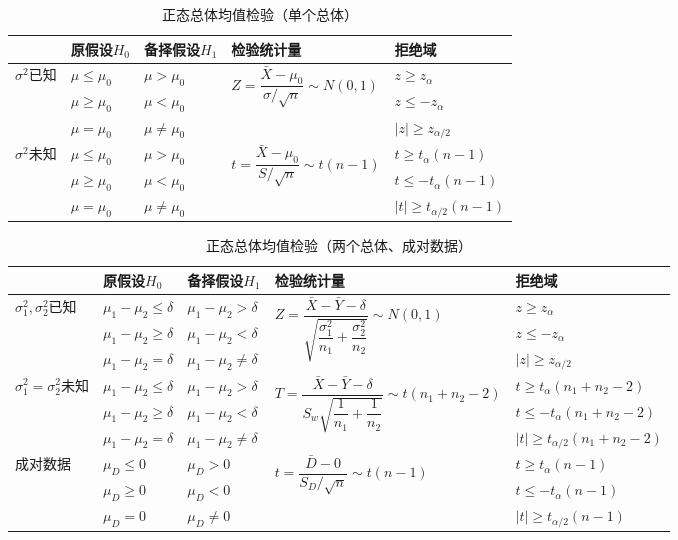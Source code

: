 \documentclass[11pt,a4paper]{report}
\theoremstyle{definition}
\theoremstyle{plain}
\begin{document}
\begin{table}[htbp]
\centering
\caption{正态总体均值检验（单个总体）}
\begin{tabular}{@{}lllll@{}}
\toprule
 & \textbf{原假设}$H_0$ & \textbf{备择假设}$H_1$ & \textbf{检验统计量} & \textbf{拒绝域} \\
\midrule
\multirow{3}{*}{$\sigma^2$已知} & $\mu\leq\mu_0$ & $\mu>\mu_0$ & \multirow{3}{*}{$Z=\dfrac{\bar{X}-\mu_0}{\sigma/\sqrt{n}}\sim N(0,1)$} & $z\geq z_\alpha$ \\
 & $\mu\geq\mu_0$ & $\mu<\mu_0$ & & $z\leq -z_\alpha$ \\
 & $\mu=\mu_0$ & $\mu\neq\mu_0$ & & $|z|\geq z_{\alpha/2}$ \\
\midrule
\multirow{3}{*}{$\sigma^2$未知} & $\mu\leq\mu_0$ & $\mu>\mu_0$ & \multirow{3}{*}{$t=\dfrac{\bar{X}-\mu_0}{S/\sqrt{n}}\sim t(n-1)$} & $t\geq t_\alpha(n-1)$ \\
 & $\mu\geq\mu_0$ & $\mu<\mu_0$ & & $t\leq -t_\alpha(n-1)$ \\
 & $\mu=\mu_0$ & $\mu\neq\mu_0$ & & $|t|\geq t_{\alpha/2}(n-1)$ \\
\bottomrule
\end{tabular}
\end{table}

\begin{table}[htbp]
\centering
\caption{正态总体均值检验（两个总体、成对数据）}
\begin{tabular}{@{}p{2.5cm}llll@{}}
\toprule
 & \textbf{原假设}$H_0$ & \textbf{备择假设}$H_1$ & \textbf{检验统计量} & \textbf{拒绝域} \\
\midrule
\multirow{3}{2.5cm}{$\sigma_1^2,\sigma_2^2$已知} & $\mu_1-\mu_2\leq\delta$ & $\mu_1-\mu_2>\delta$ & \multirow{3}{*}{$Z=\dfrac{\bar{X}-\bar{Y}-\delta}{\sqrt{\dfrac{\sigma_1^2}{n_1}+\dfrac{\sigma_2^2}{n_2}}}\sim N(0,1)$} & $z\geq z_\alpha$ \\
 & $\mu_1-\mu_2\geq\delta$ & $\mu_1-\mu_2<\delta$ & & $z\leq -z_\alpha$ \\
 & $\mu_1-\mu_2=\delta$ & $\mu_1-\mu_2\neq\delta$ & & $|z|\geq z_{\alpha/2}$ \\
\midrule
\multirow{3}{2.5cm}{$\sigma_1^2=\sigma_2^2$未知} & $\mu_1-\mu_2\leq\delta$ & $\mu_1-\mu_2>\delta$ & \multirow{3}{*}{$T=\dfrac{\bar{X}-\bar{Y}-\delta}{S_w\sqrt{\dfrac{1}{n_1}+\dfrac{1}{n_2}}}\sim t(n_1+n_2-2)$} & $t\geq t_\alpha(n_1+n_2-2)$ \\
 & $\mu_1-\mu_2\geq\delta$ & $\mu_1-\mu_2<\delta$ & & $t\leq -t_\alpha(n_1+n_2-2)$ \\
 & $\mu_1-\mu_2=\delta$ & $\mu_1-\mu_2\neq\delta$ & & $|t|\geq t_{\alpha/2}(n_1+n_2-2)$ \\
\midrule
\multirow{3}{2.5cm}{成对数据} & $\mu_D\leq 0$ & $\mu_D>0$ & \multirow{3}{*}{$t=\dfrac{\bar{D}-0}{S_D/\sqrt{n}}\sim t(n-1)$} & $t\geq t_\alpha(n-1)$ \\
 & $\mu_D\geq 0$ & $\mu_D<0$ & & $t\leq -t_\alpha(n-1)$ \\
 & $\mu_D=0$ & $\mu_D\neq 0$ & & $|t|\geq t_{\alpha/2}(n-1)$ \\
\bottomrule
\end{tabular}
\end{table}
\end{document}
